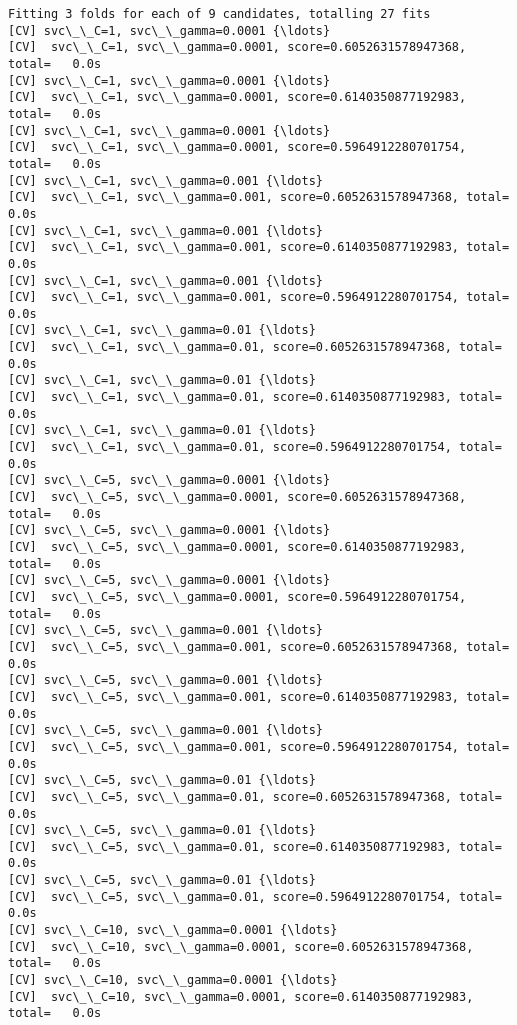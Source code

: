 \documentclass[11pt]{article}
\begin{document}
    \begin{Verbatim}[commandchars=\\\{\}]
Fitting 3 folds for each of 9 candidates, totalling 27 fits
[CV] svc\_\_C=1, svc\_\_gamma=0.0001 {\ldots}
[CV]  svc\_\_C=1, svc\_\_gamma=0.0001, score=0.6052631578947368, total=   0.0s
[CV] svc\_\_C=1, svc\_\_gamma=0.0001 {\ldots}
[CV]  svc\_\_C=1, svc\_\_gamma=0.0001, score=0.6140350877192983, total=   0.0s
[CV] svc\_\_C=1, svc\_\_gamma=0.0001 {\ldots}
[CV]  svc\_\_C=1, svc\_\_gamma=0.0001, score=0.5964912280701754, total=   0.0s
[CV] svc\_\_C=1, svc\_\_gamma=0.001 {\ldots}
[CV]  svc\_\_C=1, svc\_\_gamma=0.001, score=0.6052631578947368, total=   0.0s
[CV] svc\_\_C=1, svc\_\_gamma=0.001 {\ldots}
[CV]  svc\_\_C=1, svc\_\_gamma=0.001, score=0.6140350877192983, total=   0.0s
[CV] svc\_\_C=1, svc\_\_gamma=0.001 {\ldots}
[CV]  svc\_\_C=1, svc\_\_gamma=0.001, score=0.5964912280701754, total=   0.0s
[CV] svc\_\_C=1, svc\_\_gamma=0.01 {\ldots}
[CV]  svc\_\_C=1, svc\_\_gamma=0.01, score=0.6052631578947368, total=   0.0s
[CV] svc\_\_C=1, svc\_\_gamma=0.01 {\ldots}
[CV]  svc\_\_C=1, svc\_\_gamma=0.01, score=0.6140350877192983, total=   0.0s
[CV] svc\_\_C=1, svc\_\_gamma=0.01 {\ldots}
[CV]  svc\_\_C=1, svc\_\_gamma=0.01, score=0.5964912280701754, total=   0.0s
[CV] svc\_\_C=5, svc\_\_gamma=0.0001 {\ldots}
[CV]  svc\_\_C=5, svc\_\_gamma=0.0001, score=0.6052631578947368, total=   0.0s
[CV] svc\_\_C=5, svc\_\_gamma=0.0001 {\ldots}
[CV]  svc\_\_C=5, svc\_\_gamma=0.0001, score=0.6140350877192983, total=   0.0s
[CV] svc\_\_C=5, svc\_\_gamma=0.0001 {\ldots}
[CV]  svc\_\_C=5, svc\_\_gamma=0.0001, score=0.5964912280701754, total=   0.0s
[CV] svc\_\_C=5, svc\_\_gamma=0.001 {\ldots}
[CV]  svc\_\_C=5, svc\_\_gamma=0.001, score=0.6052631578947368, total=   0.0s
[CV] svc\_\_C=5, svc\_\_gamma=0.001 {\ldots}
[CV]  svc\_\_C=5, svc\_\_gamma=0.001, score=0.6140350877192983, total=   0.0s
[CV] svc\_\_C=5, svc\_\_gamma=0.001 {\ldots}
[CV]  svc\_\_C=5, svc\_\_gamma=0.001, score=0.5964912280701754, total=   0.0s
[CV] svc\_\_C=5, svc\_\_gamma=0.01 {\ldots}
[CV]  svc\_\_C=5, svc\_\_gamma=0.01, score=0.6052631578947368, total=   0.0s
[CV] svc\_\_C=5, svc\_\_gamma=0.01 {\ldots}
[CV]  svc\_\_C=5, svc\_\_gamma=0.01, score=0.6140350877192983, total=   0.0s
[CV] svc\_\_C=5, svc\_\_gamma=0.01 {\ldots}
[CV]  svc\_\_C=5, svc\_\_gamma=0.01, score=0.5964912280701754, total=   0.0s
[CV] svc\_\_C=10, svc\_\_gamma=0.0001 {\ldots}
[CV]  svc\_\_C=10, svc\_\_gamma=0.0001, score=0.6052631578947368, total=   0.0s
[CV] svc\_\_C=10, svc\_\_gamma=0.0001 {\ldots}
[CV]  svc\_\_C=10, svc\_\_gamma=0.0001, score=0.6140350877192983, total=   0.0s

\end{Verbatim}
\end{document}
